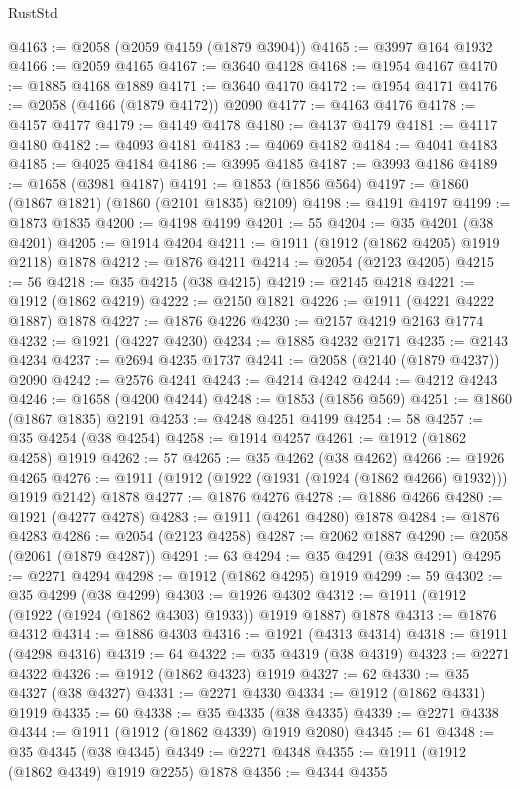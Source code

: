 \begin{lexlean}{RustStd}
\begin{coremodule}
@4163 := @2058 (@2059 @4159 (@1879 @3904))
@4165 := @3997 @164 @1932
@4166 := @2059 @4165
@4167 := @3640 @4128
@4168 := @1954 @4167
@4170 := @1885 @4168 @1889
@4171 := @3640 @4170
@4172 := @1954 @4171
@4176 := @2058 (@4166 (@1879 @4172)) @2090
@4177 := @4163 @4176
@4178 := @4157 @4177
@4179 := @4149 @4178
@4180 := @4137 @4179
@4181 := @4117 @4180
@4182 := @4093 @4181
@4183 := @4069 @4182
@4184 := @4041 @4183
@4185 := @4025 @4184
@4186 := @3995 @4185
@4187 := @3993 @4186
@4189 := @1658 (@3981 @4187)
@4191 := @1853 (@1856 @564)
@4197 := @1860 (@1867 @1821) (@1860 (@2101 @1835) @2109)
@4198 := @4191 @4197
@4199 := @1873 @1835
@4200 := @4198 @4199
@4201 := 55
@4204 := @35 @4201 (@38 @4201)
@4205 := @1914 @4204
@4211 := @1911 (@1912 (@1862 @4205) @1919 @2118) @1878
@4212 := @1876 @4211
@4214 := @2054 (@2123 @4205)
@4215 := 56
@4218 := @35 @4215 (@38 @4215)
@4219 := @2145 @4218
@4221 := @1912 (@1862 @4219)
@4222 := @2150 @1821
@4226 := @1911 (@4221 @4222 @1887) @1878
@4227 := @1876 @4226
@4230 := @2157 @4219 @2163 @1774
@4232 := @1921 (@4227 @4230)
@4234 := @1885 @4232 @2171
@4235 := @2143 @4234
@4237 := @2694 @4235 @1737
@4241 := @2058 (@2140 (@1879 @4237)) @2090
@4242 := @2576 @4241
@4243 := @4214 @4242
@4244 := @4212 @4243
@4246 := @1658 (@4200 @4244)
@4248 := @1853 (@1856 @569)
@4251 := @1860 (@1867 @1835) @2191
@4253 := @4248 @4251 @4199
@4254 := 58
@4257 := @35 @4254 (@38 @4254)
@4258 := @1914 @4257
@4261 := @1912 (@1862 @4258) @1919
@4262 := 57
@4265 := @35 @4262 (@38 @4262)
@4266 := @1926 @4265
@4276 := @1911 (@1912 (@1922 (@1931 (@1924 (@1862 @4266) @1932))) @1919 @2142) @1878
@4277 := @1876 @4276
@4278 := @1886 @4266
@4280 := @1921 (@4277 @4278)
@4283 := @1911 (@4261 @4280) @1878
@4284 := @1876 @4283
@4286 := @2054 (@2123 @4258)
@4287 := @2062 @1887
@4290 := @2058 (@2061 (@1879 @4287))
@4291 := 63
@4294 := @35 @4291 (@38 @4291)
@4295 := @2271 @4294
@4298 := @1912 (@1862 @4295) @1919
@4299 := 59
@4302 := @35 @4299 (@38 @4299)
@4303 := @1926 @4302
@4312 := @1911 (@1912 (@1922 (@1924 (@1862 @4303) @1933)) @1919 @1887) @1878
@4313 := @1876 @4312
@4314 := @1886 @4303
@4316 := @1921 (@4313 @4314)
@4318 := @1911 (@4298 @4316)
@4319 := 64
@4322 := @35 @4319 (@38 @4319)
@4323 := @2271 @4322
@4326 := @1912 (@1862 @4323) @1919
@4327 := 62
@4330 := @35 @4327 (@38 @4327)
@4331 := @2271 @4330
@4334 := @1912 (@1862 @4331) @1919
@4335 := 60
@4338 := @35 @4335 (@38 @4335)
@4339 := @2271 @4338
@4344 := @1911 (@1912 (@1862 @4339) @1919 @2080)
@4345 := 61
@4348 := @35 @4345 (@38 @4345)
@4349 := @2271 @4348
@4355 := @1911 (@1912 (@1862 @4349) @1919 @2255) @1878
@4356 := @4344 @4355

\end{coremodule}
\end{lexlean}
